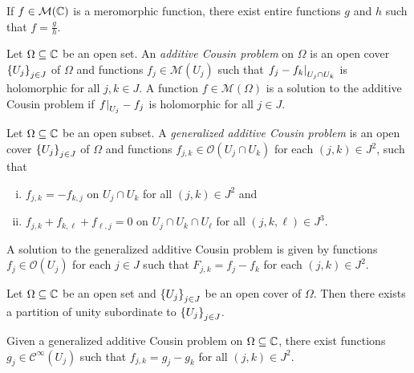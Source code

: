 \begin{izrek}
If $f \in \mathcal{M}(\mathbb{C})$ is a meromorphic function, there exist
entire functions $g$ and $h$ such that $f = \frac{g}{h}$.
\end{izrek}

\begin{definicija}
Let $\Omega \subseteq \mathbb{C}$ be an open set. An
\emph{additive Cousin problem} on
$\Omega$ is an open cover $\left\{U_j\right\}_{j \in J}$ of $\Omega$ and
functions $f_j \in \mathcal{M}(U_j)$ such that
$\left. f_j - f_k\right|_{U_j \cap U_k}^{}$ is holomorphic for all
$j, k \in J$. A function $f \in \mathcal{M}(\Omega)$ is a solution
to the additive Cousin problem if $\left. f\right|_{U_j}^{} - f_j$ is
holomorphic for all $j \in J$.
\end{definicija}

\begin{definicija}
Let $\Omega \subseteq \mathbb{C}$ be an open subset. A
\emph{generalized additive Cousin problem}
is an open cover $\left\{U_j\right\}_{j \in J}$ of $\Omega$ and functions
$f_{j,k} \in \mathcal{O}(U_j \cap U_k)$ for each $(j,k) \in J^2$,
such that

\begin{enumerate}[i)]
\item $f_{j,k} = -f_{k,j}$ on $U_j \cap U_k$ for all
$(j, k) \in J^2$ and
\item $f_{j,k} + f_{k, \ell} + f_{\ell, j} = 0$ on
$U_j \cap U_k \cap U_\ell$ for all $(j, k, \ell) \in J^3$.
\end{enumerate}

A solution to the generalized additive Cousin problem is given by
functions $f_j \in \mathcal{O}(U_j)$ for each $j \in J$ such that
$F_{j,k} = f_j - f_k$ for each $(j, k) \in J^2$.
\end{definicija}


\begin{lema}
Let $\Omega \subseteq \mathbb{C}$ be an open set and $\left\{U_j\right\}_{j \in J}$
be an open cover of $\Omega$. Then there exists a partition of
unity subordinate to $\left\{U_j\right\}_{j \in J}$.
\end{lema}

\begin{lema}
Given a generalized additive Cousin problem on
$\Omega \subseteq \mathbb{C}$, there exist functions
$g_j \in \mathcal{C}^\infty(U_j)$ such that $f_{j,k} = g_j - g_k$
for all $(j, k) \in J^2$.
\end{lema}


